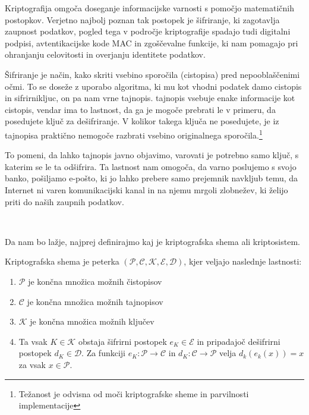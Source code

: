 \documentclass[12pt,a4paper,openany]{book}
\begin{document}
Kriptografija omgoča doseganje informacijske varnosti s pomočjo matematičnih postopkov. Verjetno najbolj poznan tak postopek je šifriranje, ki zagotavlja zaupnost podatkov, pogled tega v področje kriptografije spadajo tudi digitalni podpisi, avtentikacijske kode MAC in zgoščevalne funkcije, ki nam pomagajo pri ohranjanju celovitosti in overjanju identitete podatkov.

Šifriranje je način, kako skriti vsebino sporočila (\gls{cistopis}a) pred nepooblaščenimi očmi. To se doseže z uporabo algoritma, ki mu kot vhodni podatek damo \gls{cistopis} in \gls{sifrirnikljuc}, on pa nam vrne \gls{tajnopis}. \Gls{tajnopis} vsebuje enake informacije kot \gls{cistopis}, vendar ima to lastnost, da ga je mogoče prebrati le v primeru, da posedujete ključ za dešifriranje. V kolikor takega ključa ne posedujete, je iz \gls{tajnopis}a praktično nemogoče razbrati vsebino originalnega sporočila.\footnote{Težanost je odvisna od moči kriptografske sheme in parvilnosti implementacije}

To pomeni, da lahko tajnopis javno objavimo, varovati je potrebno samo ključ, s katerim se le ta odšifrira. Ta lastnost nam omogoča, da varno poslujemo s svojo banko, pošiljamo e-pošto, ki jo lahko prebere samo prejemnik navkljub temu, da Internet ni varen komunikacijski kanal in na njemu mrgoli zlobnežev, ki želijo priti do naših zaupnih podatkov.

\

Da nam bo lažje, najprej definirajmo kaj je kriptografska shema ali kriptosistem.

\begin{mdframed}[frametitle={Kriptografska shema}]
Kriptografska shema je peterka  $(\mathcal{P}, \mathcal{C}, \mathcal{K},  \mathcal{E}, \mathcal{D})$, kjer veljajo naslednje lastnosti:
	\begin{enumerate}
		\item $\mathcal{P}$ je končna množica možnih čistopisov
		\item $\mathcal{C}$ je končna množica možnih tajnopisov
		\item $\mathcal{K}$ je končna množica možnih ključev
		\item Ta vsak $K \in \mathcal{K}$ obstaja šifrirni postopek $e_K \in \mathcal{E}$ in pripadajoč dešifrirni postopek $d_K \in \mathcal{D}$. Za funkciji $e_K: \mathcal{P} \rightarrow \mathcal{C}$ in $d_K: \mathcal{C} \rightarrow \mathcal{P}$ velja $d_k(e_k(x)) = x$ za vsak $x \in \mathcal{P}$.
	\end{enumerate}
\end{mdframed}
\end{document}
